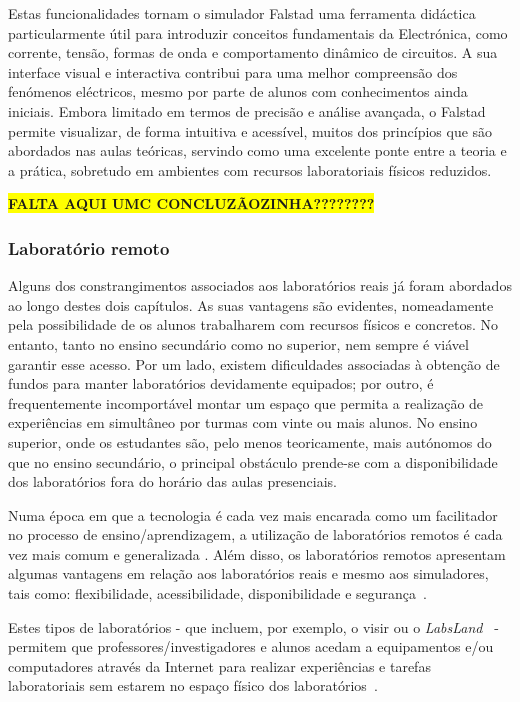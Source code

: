 Estas funcionalidades tornam o simulador Falstad uma ferramenta didáctica particularmente útil para introduzir conceitos fundamentais da Electrónica, como corrente, tensão, formas de onda e comportamento dinâmico de circuitos. A sua interface visual e interactiva contribui para uma melhor compreensão dos fenómenos eléctricos, mesmo por parte de alunos com conhecimentos ainda iniciais. Embora limitado em termos de precisão e análise avançada, o Falstad permite visualizar, de forma intuitiva e acessível, muitos dos princípios que são abordados nas aulas teóricas, servindo como uma excelente ponte entre a teoria e a prática, sobretudo em ambientes com recursos laboratoriais físicos reduzidos.

\colorbox{yellow}{\textbf{FALTA AQUI UMC CONCLUZÃOZINHA????????}}

\subsubsection{Laboratório remoto}
\label{sec: remotelaboratory}
Alguns dos constrangimentos associados aos laboratórios reais já foram abordados ao longo destes dois capítulos. As suas vantagens são evidentes, nomeadamente pela possibilidade de os alunos trabalharem com recursos físicos e concretos. No entanto, tanto no ensino secundário como no superior, nem sempre é viável garantir esse acesso. Por um lado, existem dificuldades associadas à obtenção de fundos para manter laboratórios devidamente equipados; por outro, é frequentemente incomportável montar um espaço que permita a realização de experiências em simultâneo por turmas com vinte ou mais alunos. No ensino superior, onde os estudantes são, pelo menos teoricamente, mais autónomos do que no ensino secundário, o principal obstáculo prende-se com a disponibilidade dos laboratórios fora do horário das aulas presenciais.

Numa época em que a tecnologia é cada vez mais encarada como um facilitador no processo de ensino/aprendizagem, a utilização de laboratórios remotos é cada vez mais comum e generalizada \cite{RemoteLabsImpactVISIR}. Além disso, os laboratórios remotos apresentam algumas vantagens em relação aos laboratórios reais e mesmo aos simuladores, tais como: flexibilidade, acessibilidade, disponibilidade e segurança~\cite{RemoteLabsImpactVISIR}.

Estes tipos de laboratórios - que incluem, por exemplo, o \acrshort{visir} ou o \textit{LabsLand}~\cite{labsland} - permitem que professores/investigadores e alunos acedam a equipamentos e/ou computadores através da Internet para realizar experiências e tarefas laboratoriais sem estarem no espaço físico dos laboratórios~\cite{ExperiencesRemoteLab}.

